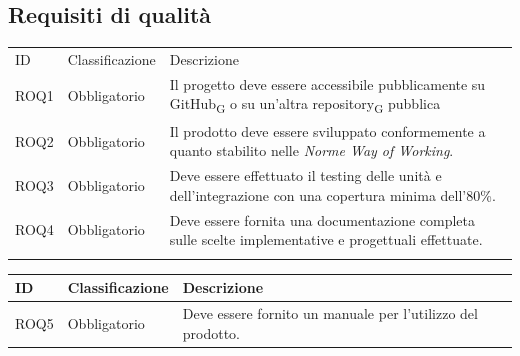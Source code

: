 \documentclass{article}
\begin{document}
\subsection{Requisiti di qualità}

\begin{center}
    \begin{tabular}{|p{3cm}|p{3cm}|p{6cm}|}
    \rowcolor{Blue} 
\hline
ID & Classificazione & Descrizione\\ 
\rowcolor{LightBlue}
\hline
ROQ1& Obbligatorio & Il progetto deve essere accessibile pubblicamente su GitHub\textsubscript{G} o su un'altra repository\textsubscript{G} pubblica\\ 
\rowcolor{LighterBlue}
\hline
ROQ2& Obbligatorio & Il prodotto deve essere sviluppato conformemente a quanto stabilito nelle \textit{Norme Way of Working}. \\ 
\rowcolor{LightBlue}
\hline
ROQ3& Obbligatorio & Deve essere effettuato il testing delle unità e dell'integrazione con una copertura minima dell'80\%.\\
\hline
\rowcolor{LighterBlue}

ROQ4& Obbligatorio & Deve essere fornita una documentazione completa sulle scelte implementative e progettuali effettuate.\\
\rowcolor{LightBlue}
\hline
\end{tabular}
\begin{tabular}{|p{3cm}|p{3cm}|p{6cm}|}
    \rowcolor{Blue} 
\hline
ID & Classificazione & Descrizione\\
\hline
\rowcolor{LightBlue}
ROQ5& Obbligatorio & Deve essere fornito un manuale per l'utilizzo del prodotto.\\
\hline
\end{tabular}
\label{tab:reqal}
\end{center}
\end{document}
